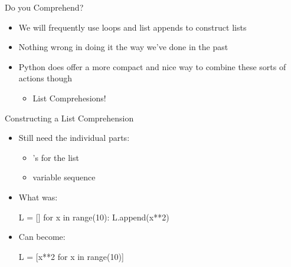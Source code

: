 \documentclass[pdf, aspectratio=169, 12pt]{beamer}
\begin{document}

\begin{frame}{Do you Comprehend?}
	\begin{itemize}
		\item We will frequently use  loops and list appends to construct lists
		\item Nothing wrong in doing it the way we've done in the past
		\item Python does offer a more compact and nice way to combine these sorts of actions though
			\begin{itemize}
				\item \alert{List Comprehesions!}
			\end{itemize}
	\end{itemize}
\end{frame}

\begin{frame}[fragile]{Constructing a List Comprehension}
	\begin{itemize}
		\item Still need the individual parts:
			\begin{itemize}
				\item \pyi{[]}'s for the list
				\item {} variable  sequence
			\end{itemize}
		\item What was:
			\begin{pythoncode}
				L = []
				for x in range(10):
					L.append(x**2)
			\end{pythoncode}
		\item Can become:
			\begin{pythoncode}
				L = [x**2 for x in range(10)]
			\end{pythoncode}
	\end{itemize}
\end{frame}
\end{document}
